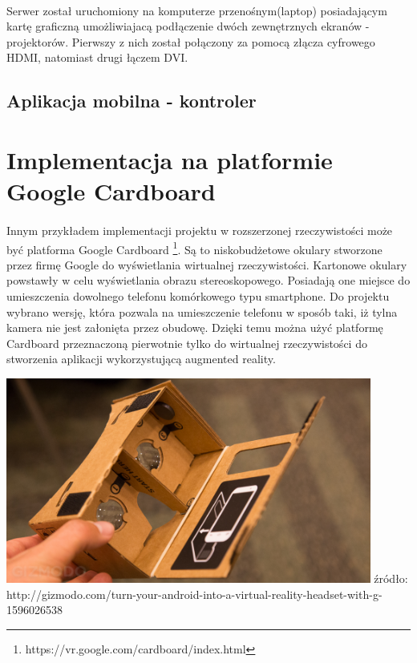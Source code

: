 \documentclass[12pt]{article}
\begin{document}
{\paragraph{}
Serwer został uruchomiony na komputerze przenośnym(laptop) posiadającym kartę graficzną umożliwiajacą podłączenie dwóch zewnętrznych ekranów - projektorów. Pierwszy z nich został połączony za pomocą złącza cyfrowego HDMI, natomiast drugi łączem DVI.
\subsection{Aplikacja mobilna - kontroler}


\newpage
\section{Implementacja na platformie Google Cardboard}
\paragraph{}
Innym przykładem implementacji projektu w rozszerzonej rzeczywistości może być platforma Google Cardboard \footnote{https://vr.google.com/cardboard/index.html}. Są to niskobudżetowe okulary stworzone przez firmę Google do wyświetlania wirtualnej rzeczywistości. Kartonowe okulary powstawły w celu wyświetlania obrazu stereoskopowego. Posiadają one miejsce do umieszczenia dowolnego telefonu komórkowego typu smartphone. Do projektu wybrano wersję, która pozwala na umieszczenie telefonu w sposób taki, iż tylna kamera nie jest załonięta przez obudowę. Dzięki temu można użyć platformę Cardboard przeznaczoną pierwotnie tylko do wirtualnej rzeczywistości do stworzenia aplikacji wykorzystującą augmented reality.

\begin{center}
\includegraphics[width=0.9\textwidth]{images/cardboard.jpg}
\small {źródło: http://gizmodo.com/turn-your-android-into-a-virtual-reality-headset-with-g-1596026538 }
\end{center}

}
\end{document}
